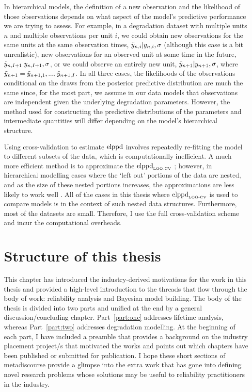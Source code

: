 In hierarchical models, the definition of a new observation and the likelihood of those observations depends on what aspect of the model's predictive performance we are trying to assess. For example, in a degradation dataset with multiple units $n$ and multiple observations per unit $i$, we could obtain new observations for the same units at the same observation times, $\Tilde{y}_{n,i} | y_{n, i}, \sigma$ (although this case is a bit unrealistic), new observations for an observed unit at some time in the future, $\Tilde{y}_{n, I + 1}|y_{n, I + 1}, \sigma$, or we could observe an entirely new unit, $\Tilde{y}_{n + 1}|y_{n + 1}, \sigma$, where $\Tilde{y}_{n + 1} = {\Tilde{y}_{n + 1, 1}, ..., \Tilde{y}_{n + 1, I}}$. In all three cases, the likelihoods of the observations conditional on the draws from the posterior predictive distribution are much the same since, for the most part, we assume in our data models that observations are independent given the underlying degradation parameters. However, the method used for constructing the predictive distributions of the parameters and intermediate quantities will differ depending on the model's hierarchical structure.

Using cross-validation to estimate $\hbox{elppd}$ involves repeatedly re-fitting the model to different subsets of the data, which is computationally inefficient. A much more efficient method is to approximate the $\hbox{elppd}_{\text{\tiny{LOO-CV}}}$ \citep{Vehtari2017}; however, in hierarchical modelling cases where the `left out' portions of the data are nested, and as the size of these nested portions increases, the approximations are less likely to work well \citep{Vehtari2017}. All of the cases in this thesis where $\hbox{elppd}_{\text{\tiny{LOO-CV}}}$ is used to compare models is in the context of such nested data structures. Furthermore, most of the datasets are small. Therefore, I use the full cross-validation scheme and incur the computational overheads.

\section{Structure of this thesis}
\label{sec:thesis-structure}

This chapter has introduced the industry-derived motivations for the work in this thesis and provided a high-level introduction to the threads that flow through the body of work: reliability analysis and Bayesian model building. The body of the thesis is divided into two parts and unified at the end by a general \hbox{discussion/concluding} chapter. Part~\ref{part:one} addresses lifetime analysis, whereas Part~\ref{part:two} addresses degradation modelling. At the beginning of each part, I have included a preamble that provides a background on the industry placement project/s that motivated the works and points out which chapters have been published or submitted for publication. I hope these short sections of metadiscourse provide a glimpse into the extra work that has gone into defining novel research problems whose solutions may be useful to reliability practitioners in the industry.

